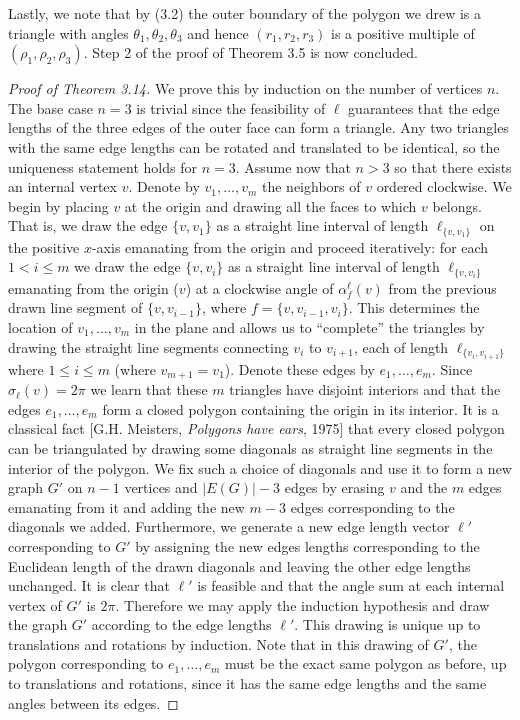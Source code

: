 Lastly, we note that by (3.2) the outer boundary of the polygon we drew is a triangle with angles $\theta_1,\theta_2,\theta_3$ and hence $(r_1,r_2,r_3)$ is a positive multiple of $(\rho_1,\rho_2,\rho_3)$. Step 2 of the proof of Theorem 3.5 is now concluded.
\begin{proof}[Proof of Theorem 3.14]
We prove this by induction on the number of vertices $n$. The base case $n=3$ is trivial since the feasibility of $\boldsymbol\ell$ guarantees that the edge lengths of the three edges of the outer face can form a triangle. Any two triangles with the same edge lengths can be rotated and translated to be identical, so the uniqueness statement holds for $n=3$.
Assume now that $n>3$ so that there exists an internal vertex $v$. Denote by $v_1,\ldots,v_m$ the neighbors of $v$ ordered clockwise. We begin by placing $v$ at the origin and drawing all the faces to which $v$ belongs. That is, we draw the edge $\{v,v_1\}$ as a straight line interval of length $\ell_{\{v,v_1\}}$ on the positive $x$-axis emanating from the origin and proceed iteratively: for each $1<i\le m$ we draw the edge $\{v,v_i\}$ as a straight line interval of length $\ell_{\{v,v_i\}}$ emanating from the origin ($v$) at a clockwise angle of $\alpha_f^{\boldsymbol\ell}(v)$ from the previous drawn line segment of $\{v,v_{i-1}\}$, where $f=\{v,v_{i-1},v_i\}$.
This determines the location of $v_1,\ldots,v_m$ in the plane and allows us to ``complete'' the triangles by drawing the straight line segments connecting $v_i$ to $v_{i+1}$, each of length $\ell_{\{v_i,v_{i+1}\}}$ where $1\le i\le m$ (where $v_{m+1}=v_1$). Denote these edges by $e_1,\ldots,e_m$.
Since $\sigma_{\boldsymbol\ell}(v)=2\pi$ we learn that these $m$ triangles have disjoint interiors and that the edges $e_1,\ldots,e_m$ form a closed polygon containing the origin in its interior. It is a classical fact [G.H. Meisters, \emph{Polygons have ears}, 1975] that every closed polygon can be triangulated by drawing some diagonals as straight line segments in the interior of the polygon.
We fix such a choice of diagonals and use it to form a new graph $G'$ on $n-1$ vertices and $|E(G)|-3$ edges by erasing $v$ and the $m$ edges emanating from it and adding the new $m-3$ edges corresponding to the diagonals we added. Furthermore, we generate a new edge length vector $\boldsymbol\ell'$ corresponding to $G'$ by assigning the new edges lengths corresponding to the Euclidean length of the drawn diagonals and leaving the other edge lengths unchanged.
It is clear that $\boldsymbol\ell'$ is feasible and that the angle sum at each internal vertex of $G'$ is $2\pi$. Therefore we may apply the induction hypothesis and draw the graph $G'$ according to the edge lengths $\boldsymbol\ell'$. This drawing is unique up to translations and rotations by induction. Note that in this drawing of $G'$, the polygon corresponding to $e_1,\ldots,e_m$ must be the exact same polygon as before, up to translations and rotations, since it has the same edge lengths and the same angles between its edges.

\end{proof}
